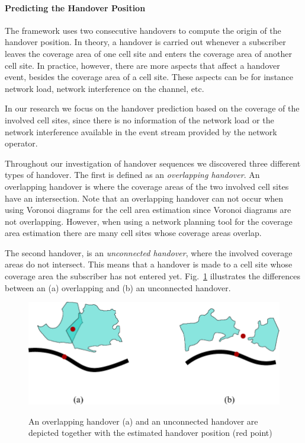 \paragraph{Predicting the Handover Position}
The framework uses two consecutive handovers to compute the origin of the handover position. In theory, a handover is carried out whenever a subscriber leaves the coverage area of one cell site and enters the coverage area of another cell site. In practice, however, there are more aspects that affect a handover event, besides the coverage area of a cell site. These aspects can be for instance network load, network interference on the channel, etc.

In our research we focus on the handover prediction based on the coverage of the involved cell sites, since there is no information of the network load or the network interference available in the event stream provided by the network operator.

Throughout our investigation of handover sequences we discovered three different types of handover. The first is defined as an \emph{overlapping handover}. 
An overlapping handover is where the coverage areas of the two involved cell sites have an intersection. Note that an overlapping handover can not occur when using Voronoi diagrams for the cell area estimation since Voronoi diagrams are not overlapping. However, when using a network planning tool for the coverage area estimation there are many cell sites whose coverage areas overlap. 

The second handover, is an \emph{unconnected handover}, where the involved coverage areas do not intersect. This means that a handover is made to a cell site whose coverage area the subscriber has not entered yet. Fig.~\ref{fig:handover} illustrates the differences between an (a) overlapping and (b) an unconnected handover.

\begin{figure}[h!]

		\caption{ An overlapping handover (a) and an unconnected handover are depicted together with the estimated handover position (red point)
		}
		\includegraphics[width=\columnwidth]{handover}
		\label{fig:handover}
	\end{figure}

